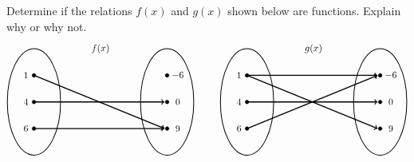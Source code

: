 \documentclass[11pt,letterpaper]{article}
\begin{document}


 Determine if the relations $f(x)$ and $g(x)$ shown below are functions. Explain why or why not. 
	\[
	\begin{tikzpicture}
	\node at (2.5,2) {$f(x)$};
	\draw[line width=0.03cm] (0,0) circle (1 and 2);
	\draw[line width=0.03cm] (5,0) circle (1 and 2);
	
	\draw[fill=black] (0,1) circle (0.07);
	\draw[fill=black] (0,0) circle (0.07);
	\draw[fill=black] (0,-1) circle (0.07);
	
	\draw[fill=black] (5,1) circle (0.07);
	\draw[fill=black] (5,0) circle (0.07);
	\draw[fill=black] (5,-1) circle (0.07);
	
	\draw[line width=0.04cm,->] (0,1) -- (4.9,-1);
	\draw[line width=0.04cm,->] (0,0) -- (4.9,0);
	\draw[line width=0.04cm,->] (0,-1) -- (4.9,-1);
	
	\node at (-0.3,1) {$1$};
	\node at (-0.3,0) {$4$};
	\node at (-0.3,-1) {$6$};
	
	\node at (5.4,1) {$-6$};
	\node at (5.4,0) {$0$};
	\node at (5.4,-1) {$9$};
	
	\tikzset{shift={(8,0)}}
	\node at (2.5,2) {$g(x)$};
	\draw[line width=0.03cm] (0,0) circle (1 and 2);
	\draw[line width=0.03cm] (5,0) circle (1 and 2);
	
	\draw[fill=black] (0,1) circle (0.07);
	\draw[fill=black] (0,0) circle (0.07);
	\draw[fill=black] (0,-1) circle (0.07);
	
	\draw[fill=black] (5,1) circle (0.07);
	\draw[fill=black] (5,0) circle (0.07);
	\draw[fill=black] (5,-1) circle (0.07);
	
	\draw[line width=0.04cm,->] (0,1) -- (4.9,-1);
	\draw[line width=0.04cm,->] (0,1) -- (4.9,1);
	\draw[line width=0.04cm,->] (0,0) -- (4.9,0);
	\draw[line width=0.04cm,->] (0,-1) -- (4.9,1);
	
	\node at (-0.3,1) {$1$};
	\node at (-0.3,0) {$4$};
	\node at (-0.3,-1) {$6$};
	
	\node at (5.4,1) {$-6$};
	\node at (5.4,0) {$0$};
	\node at (5.4,-1) {$9$};
	\end{tikzpicture}
	\]



\newpage
\end{document}
